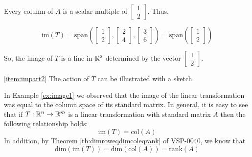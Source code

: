 \documentclass{ximera}
\begin{document}
\begin{example}
\begin{explanation}
Every column of $A$ is a scalar multiple of $\begin{bmatrix}1\\2\end{bmatrix}$.  Thus,

$$\mbox{im}(T)=\mbox{span}\left(\begin{bmatrix}1\\2\end{bmatrix}, \begin{bmatrix}2\\4\end{bmatrix}, \begin{bmatrix}3\\6\end{bmatrix}\right)=\mbox{span}\left(\begin{bmatrix}1\\2\end{bmatrix}\right)$$

So, the image of $T$ is a line in $\mathbb{R}^2$ determined by the vector $\begin{bmatrix}1\\2\end{bmatrix}$.

\ref{item:impart2} The action of $T$ can be illustrated with a sketch.

\begin{center}
\end{center}
\end{explanation}
\end{example}


In Example \ref{ex:image1} we observed that the image of the linear transformation was equal to the column space of its standard matrix.  In general, it is easy to see that if $T:\mathbb{R}^n\rightarrow \mathbb{R}^m$ is a linear transformation with standard matrix $A$ then the following relationship holds:
$$\mbox{im}(T)=\mbox{col}(A)$$
In addition, by Theorem \ref{th:dimroweqdimcoleqrank} of VSP-0040, we know that
$$\mbox{dim}(\mbox{im}(T))=\mbox{dim}(\mbox{col}(A))=\mbox{rank}(A)$$
\end{document}

